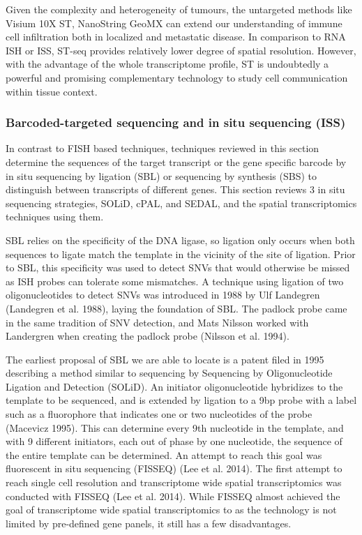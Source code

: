 Given the complexity and heterogeneity of tumours, the untargeted methods like Visium 10X  ST, NanoString GeoMX can extend our understanding of immune cell infiltration both in localized and metastatic disease. In comparison to RNA ISH or ISS, ST-seq provides relatively lower degree of spatial resolution. However, with the advantage of the whole transcriptome profile, ST is undoubtedly a powerful and promising complementary technology to study cell communication within tissue context.  

\subsubsection{Barcoded-targeted sequencing and in situ sequencing (ISS)}
In contrast to FISH based techniques, techniques reviewed in this section determine the sequences of the target transcript or the gene specific barcode by in situ sequencing by ligation (SBL) or sequencing by synthesis (SBS) to distinguish between transcripts of different genes. This section reviews 3 in situ sequencing strategies, SOLiD, cPAL, and SEDAL, and the spatial transcriptomics techniques using them.

SBL relies on the specificity of the DNA ligase, so ligation only occurs when both sequences to ligate match the template in the vicinity of the site of ligation. Prior to SBL, this specificity was used to detect SNVs that would otherwise be missed as ISH probes can tolerate some mismatches. A technique using ligation of two oligonucleotides to detect SNVs was introduced in 1988 by Ulf Landegren (Landegren et al. 1988), laying the foundation of SBL. The padlock probe came in the same tradition of SNV detection, and Mats Nilsson worked with Landergren when creating the padlock probe (Nilsson et al. 1994).

The earliest proposal of SBL we are able to locate is a patent filed in 1995 describing a method similar to sequencing by Sequencing by Oligonucleotide Ligation and Detection (SOLiD). An initiator oligonucleotide hybridizes to the template to be sequenced, and is extended by ligation to a 9bp probe with a label such as a fluorophore that indicates one or two nucleotides of the probe (Macevicz 1995). This can determine every 9th nucleotide in the template, and with 9 different initiators, each out of phase by one nucleotide, the sequence of the entire template can be determined.  An attempt to reach this goal was fluorescent in situ sequencing (FISSEQ) (Lee et al. 2014). The first attempt to reach single cell resolution and transcriptome wide spatial transcriptomics was conducted with FISSEQ (Lee et al. 2014). While FISSEQ almost achieved the goal of transcriptome wide spatial transcriptomics to as the technology is not limited by pre-defined gene panels, it still has a few disadvantages. 


